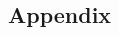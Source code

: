\documentclass{article}
\begin{document}
\begin{multicols}{2}
    \subsection*{Appendix}
    
    
    
  \end{multicols}
\end{document}
